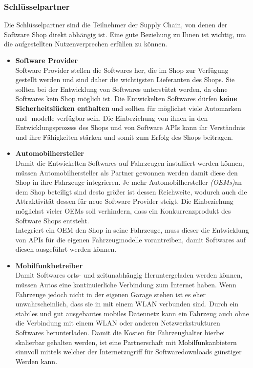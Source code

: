 \subsubsection{Schlüsselpartner}
Die Schlüsselpartner sind die Teilnehmer der Supply Chain, von denen der Software Shop direkt abhängig ist.\cite[Vgl. ]{b105} Eine gute Beziehung zu Ihnen ist wichtig, um die aufgestellten Nutzenverprechen erfüllen zu können.
\begin{itemize}
	\item \textbf{Software Provider}\\
	Software Provider stellen die Softwares her, die im Shop zur Verfügung gestellt werden und sind daher die wichtigsten Lieferanten des Shops. Sie sollten bei der Entwicklung von Softwares unterstützt werden, da ohne Softwares kein Shop möglich ist. Die Entwickelten Softwares dürfen \textbf{keine Sicherheitslücken enthalten} und sollten für möglichst viele Automarken und -modelle verfügbar sein. Die Einbeziehung von ihnen in den Entwicklungsprozess des Shops und von Software APIs kann ihr Verständnis und ihre Fähigkeiten stärken und somit zum Erfolg des Shops beitragen.
	
	\item \textbf{Automobilhersteller}\\
	Damit die Entwickelten Softwares auf Fahrzeugen installiert werden können, müssen Automobilhersteller als Partner gewonnen werden damit diese den Shop in ihre Fahrzeuge integrieren. Je mehr Automobilhersteller \textit{(OEMs)}an dem Shop beteiligt sind desto größer ist dessen Reichweite, wodurch auch die Attraktivität dessen für neue Software Provider steigt. Die Einbeziehung möglichst vieler OEMs soll verhindern, dass ein Konkurrenzprodukt des Software Shops entsteht.\\
	Integriert ein OEM den Shop in seine Fahrzeuge, muss dieser die Entwicklung von APIs für die eigenen Fahrzeugmodelle vorantreiben, damit Softwares auf diesen ausgeführt werden können.
	
	\item \textbf{Mobilfunkbetreiber}\\
	Damit Softwares orts- und zeitunabhängig Heruntergeladen werden können, müssen Autos eine kontinuierliche Verbindung zum Internet haben. Wenn Fahrzeuge jedoch nicht in der eigenen Garage stehen ist es eher unwahrscheinlich, dass sie in mit einem WLAN verbunden sind. Durch ein stabiles und gut ausgebautes mobiles Datennetz kann ein Fahrzeug auch ohne die Verbindung mit einem WLAN oder anderen Netzwerkstrukturen Softwares herunterladen. Damit die Kosten für Fahrzeughalter hierbei skalierbar gehalten werden, ist eine Partnerschaft mit Mobilfunkanbietern sinnvoll mittels welcher der Internetzugriff für Softwaredownloads günstiger Werden kann.
	

\end{itemize}
